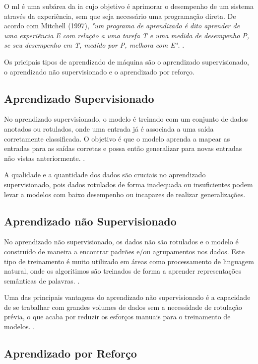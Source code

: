 O \gls{ml} é uma subárea da \gls{ia} cujo objetivo é aprimorar o desempenho de um sistema através da experiência, sem que seja necessário uma programação direta. De acordo com Mitchell (1997), \textit{"um programa de aprendizado é dito aprender de uma experiência E com relação a uma tarefa T e uma medida de desempenho P, se seu desempenho em T, medido por P, melhora com E".} \cite{Mitchell1997}. 

Os pricipais tipos de aprendizado de máquina são o aprendizado supervisionado, o aprendizado não supervisionado e o aprendizado por reforço. 

\subsection{Aprendizado Supervisionado}\label{subsec:ml1}

No aprendizado supervisionado, o modelo é treinado com um conjunto de dados anotados ou rotulados, onde uma entrada já é associada a uma saída corretamente classificada. O objetivo é que o modelo aprenda a mapear as entradas para as saídas corretas e possa então generalizar para novas entradas não vistas anteriormente. \cite{Goodfellow2016}.

A qualidade e a quantidade dos dados são cruciais no aprendizado supervisionado, pois dados rotulados de forma inadequada ou insuficientes podem levar a modelos com baixo desempenho ou incapazes de realizar generalizações.

\subsection{Aprendizado não Supervisionado}\label{subsec:ml2}

No aprendizado não supervisionado, os dados não são rotulados e o modelo é construído de maneira a encontrar padrões e/ou agrupamentos nos dados. Este tipo de treinamento é muito utilizado em áreas como processamento de linguagem natural, onde os algoritimos são treinados de forma a aprender representações semânticas de palavras. \cite{Goodfellow2016}.

Uma das principais vantagens do aprendizado não supervisionado é a capacidade de se trabalhar com grandes volumes de dados sem a necessidade de rotulação prévia, o que acaba por reduzir os esforços manuais para o treinamento de modelos. \cite{Murphy2012}.  

\subsection{Aprendizado por Reforço}\label{subsec:ml3}

